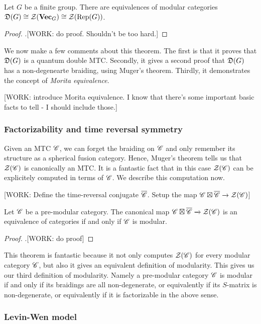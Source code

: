 \begin{proposition} Let $G$ be a finite group. There are equivalences of modular categories $\mathfrak{D}(G)\cong \mathcal{Z}(\mathbf{Vec}_G)\cong \mathcal{Z}(\operatorname{Rep}(G))$.
\end{proposition}
\begin{proof}.[WORK: do proof. Shouldn't be too hard.]
\end{proof}

We now make a few comments about this theorem. The first is that it proves that $\mathfrak{D}(G)$ is a quantum double MTC. Secondly, it gives a second proof that $\mathfrak{D}(G)$ has a non-degenearte braiding, using Muger's theorem. Thirdly, it demonstrates the concept of \textit{Morita equivalence}.

[WORK: introduce Morita equivalence. I know that there's some important basic facts to tell - I should include those.]

\subsubsection{Factorizability and time reversal symmetry}

Given an MTC $\mathscr{C}$, we can forget the braiding on $\mathscr{C}$ and only remember its structure as a spherical fusion category. Hence, Muger's theorem tells us that $\mathcal{Z}(\mathscr{C})$ is canonically an MTC. It is a fantastic fact that in this case $\mathcal{Z}(\mathscr{C})$ can be explicitely computed in terms of $\mathscr{C}$. We describe this computation now.

[WORK: Define the time-reversal conjugate $\overline{\mathscr{C}}$. Setup the map $\mathscr{C}\boxtimes \overline{\mathscr{C}}\xrightarrow{}\mathcal{Z}(\mathscr{C})$]

\begin{proposition} Let $\mathscr{C}$ be a pre-modular category. The canonical map $\mathscr{C}\boxtimes \overline{\mathscr{C}}\xrightarrow{}\mathcal{Z}(\mathscr{C})$ is an equivalence of categories if and only if $\mathscr{C}$ is modular.
\end{proposition}
\begin{proof}.[WORK: do proof]
\end{proof}

This theorem is fantastic because it not only computes $\mathcal{Z}(\mathscr{C})$ for every modular category $\mathscr{C}$, but also it gives an equivalent definition of modularity. This gives us our third definition of modularity. Namely a pre-modular category $\mathscr{C}$ is modular if and only if its braidings are all non-degenerate, or equivalently if its $S$-matrix is non-degenerate, or equivalently if it is factorizable in the above sense.

\subsubsection{Levin-Wen model}


